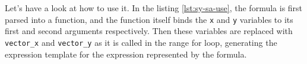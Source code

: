 \documentclass[../paper.tex]{subfiles}
\begin{document}


Let's have a look at how to use it.
In the listing \ref{lst:sy-sa-use}, the formula is first parsed into a function,
and the function itself binds the \lstinline{x} and \lstinline{y} variables to
its first and second arguments respectively. Then these variables are replaced
with \lstinline{vector_x} and \lstinline{vector_y} as it is called in the range
for loop, generating the expression template for the expression represented by
the formula.


\end{document}
